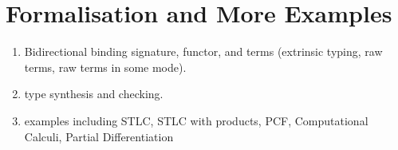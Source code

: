 
\section{Formalisation and More Examples} \label{sec:formalisation}
\begin{enumerate}
  \item Bidirectional binding signature, functor, and terms (extrinsic typing, raw terms, raw terms in some mode).
  \item type synthesis and checking.
  \item examples including STLC, STLC with products, PCF, Computational Calculi, Partial Differentiation
\end{enumerate}
